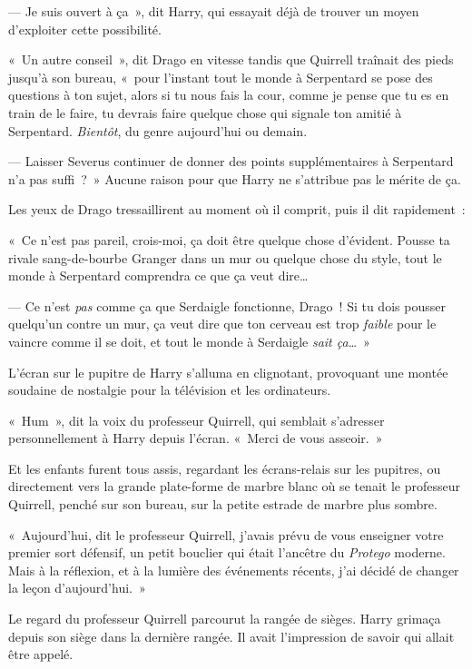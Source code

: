--- Je suis ouvert à ça~», dit Harry, qui essayait déjà de trouver un moyen d'exploiter cette possibilité.

«~Un autre conseil~», dit Drago en vitesse tandis que Quirrell traînait des pieds jusqu'à son bureau, «~pour l'instant tout le monde à Serpentard se pose des questions à ton sujet, alors si tu nous fais la cour, comme je pense que tu es en train de le faire, tu devrais faire quelque chose qui signale ton amitié à Serpentard. \emph{Bientôt}, du genre aujourd'hui ou demain.

--- Laisser Severus continuer de donner des points supplémentaires à Serpentard n'a pas suffi~?~» Aucune raison pour que Harry ne s'attribue pas le mérite de ça.

Les yeux de Drago tressaillirent au moment où il comprit, puis il dit rapidement~:

«~Ce n'est pas pareil, crois-moi, ça doit être quelque chose d'évident. Pousse ta rivale sang-de-bourbe Granger dans un mur ou quelque chose du style, tout le monde à Serpentard comprendra ce que ça veut dire…

--- Ce n'est \emph{pas} comme ça que Serdaigle fonctionne, Drago~! Si tu dois pousser quelqu'un contre un mur, ça veut dire que ton cerveau est trop \emph{faible} pour le vaincre comme il se doit, et tout le monde à Serdaigle \emph{sait ça}…~»

L'écran sur le pupitre de Harry s'alluma en clignotant, provoquant une montée soudaine de nostalgie pour la télévision et les ordinateurs.

«~Hum~», dit la voix du professeur Quirrell, qui semblait s'adresser personnellement à Harry depuis l'écran. «~Merci de vous asseoir.~»

\later

Et les enfants furent tous assis, regardant les écrans-relais sur les pupitres, ou directement vers la grande plate-forme de marbre blanc où se tenait le professeur Quirrell, penché sur son bureau, sur la petite estrade de marbre plus sombre.

«~Aujourd'hui, dit le professeur Quirrell, j'avais prévu de vous enseigner votre premier sort défensif, un petit bouclier qui était l'ancêtre du \emph{Protego} moderne. Mais à la réflexion, et à la lumière des événements récents, j'ai décidé de changer la leçon d'aujourd'hui.~»

Le regard du professeur Quirrell parcourut la rangée de sièges. Harry grimaça depuis son siège dans la dernière rangée. Il avait l'impression de savoir qui allait être appelé.

